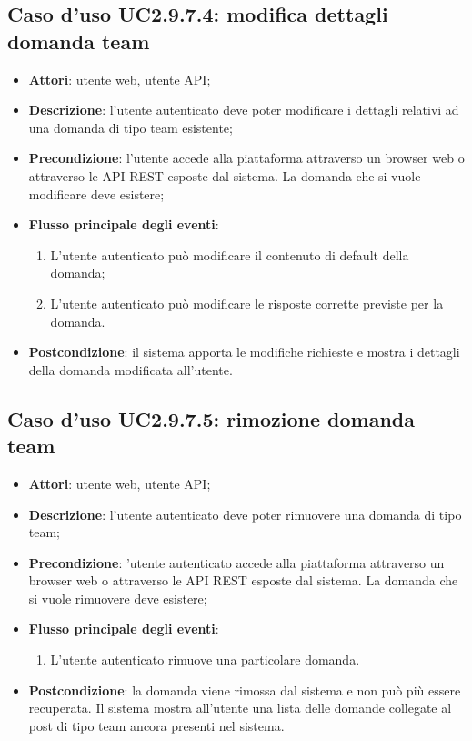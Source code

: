 \subsection{Caso d'uso UC2.9.7.4: modifica dettagli domanda team}
\begin{itemize}
\item \textbf{Attori}: utente web, utente API;
\item \textbf{Descrizione}: l'utente autenticato deve poter modificare i dettagli relativi ad una domanda di tipo team esistente; 
      \item \textbf{Precondizione}: l'utente accede alla piattaforma attraverso un browser web o attraverso le API REST esposte dal sistema. La domanda che si vuole modificare deve esistere;

        \item \textbf{Flusso principale degli eventi}:
          \begin{enumerate}
          \item L'utente autenticato può modificare il contenuto di default della domanda;
          \item L'utente autenticato può modificare le risposte corrette previste per la domanda.

      \end{enumerate}
    \item \textbf{Postcondizione}: il sistema apporta le modifiche richieste e mostra i dettagli della domanda modificata all'utente.
  \end{itemize}
\hypertarget{UC2.9.7.5}{}
\subsection{Caso d'uso UC2.9.7.5: rimozione domanda team}
\begin{itemize}
\item \textbf{Attori}: utente web, utente API;
\item \textbf{Descrizione}: l'utente autenticato deve poter rimuovere una domanda di tipo team; 
      \item \textbf{Precondizione}: 'utente autenticato accede alla piattaforma attraverso un browser web o attraverso le API REST esposte dal sistema. La domanda che si vuole rimuovere deve esistere;

        \item \textbf{Flusso principale degli eventi}:
          \begin{enumerate}
          \item L'utente autenticato rimuove una particolare domanda.

      \end{enumerate}
    \item \textbf{Postcondizione}: la domanda viene rimossa dal sistema e non può più essere recuperata. Il sistema mostra all'utente una lista delle domande collegate al post di tipo team ancora presenti nel sistema.
  \end{itemize}
\hypertarget{UC2.9.7.6}{}
